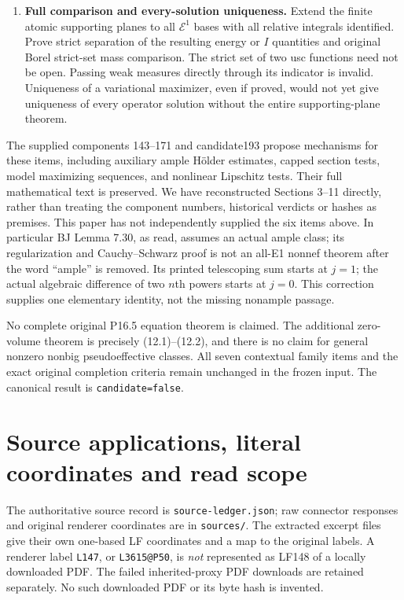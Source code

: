 \documentclass[10pt]{article}
\newcommand{\E}{\mathcal E}
\begin{document}
\begin{enumerate}
independently justified genuine strong-completeness argument. Only then
may both signs of (11.8) identify its measure with the target. No target
may be used to define $M$ itself.
\item \textbf{Full comparison and every-solution uniqueness.}
Extend the finite atomic supporting planes to all $\E^1$ bases with all
relative integrals identified. Prove strict separation of the resulting
energy or $I$ quantities and original Borel strict-set mass comparison.
The strict set of two usc functions need not be open. Passing weak
measures directly through its indicator is invalid. Uniqueness of a
variational maximizer, even if proved, would not yet give uniqueness of
every operator solution without the entire supporting-plane theorem.
\end{enumerate}

The supplied components 143--171 and candidate193 propose mechanisms for
these items, including auxiliary ample H\"older estimates, capped section
tests, model maximizing sequences, and nonlinear Lipschitz tests. Their
full mathematical text is preserved. We have reconstructed Sections
3--11 directly, rather than treating the component numbers, historical
verdicts or hashes as premises. This paper has not independently supplied
the six items above. In particular BJ Lemma 7.30, as read, assumes an
actual ample class; its regularization and Cauchy--Schwarz proof is not
an all-E1 nonnef theorem after the word ``ample'' is removed. Its printed
telescoping sum starts at $j=1$; the actual algebraic difference of two
$n$th powers starts at $j=0$. This correction supplies one elementary
identity, not the missing nonample passage.

No complete original P16.5 equation theorem is claimed. The additional
zero-volume theorem is precisely (12.1)--(12.2), and there is no claim
for general nonzero nonbig pseudoeffective classes. All seven contextual
family items and the exact original completion criteria remain unchanged
in the frozen input. The canonical result is \texttt{candidate=false}.

\appendix
\section{Source applications, literal coordinates and read scope}
The authoritative source record is \texttt{source-ledger.json}; raw
connector responses and original renderer coordinates are in
\texttt{sources/}. The extracted excerpt files give their own one-based
LF coordinates and a map to the original labels. A renderer label
\texttt{L147}, or \texttt{L3615@P50}, is \emph{not} represented as LF148
of a locally downloaded PDF. The failed inherited-proxy PDF downloads
are retained separately. No such downloaded PDF or its byte hash is
invented.
\end{document}
